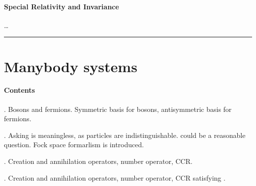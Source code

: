 \documentclass[letterpaper,10pt,english]{jupyterBook}
\begin{document}
\subsubsection*{Special Relativity and Invariance}

\sphinxAtStartPar
{}…


\bigskip\hrule\bigskip


\sphinxstepscope


\chapter{Many\sphinxhyphen{}body systems}
\label{\detokenize{ch/quantum-mechanics/many-body/many-body-quantum-mechanics:many-body-systems}}\label{\detokenize{ch/quantum-mechanics/many-body/many-body-quantum-mechanics:quantum-mechanics-many-body-quantum-mechanics}}\label{\detokenize{ch/quantum-mechanics/many-body/many-body-quantum-mechanics::doc}}\subsubsection*{Contents}

\sphinxAtStartPar
{\hyperref[\detokenize{ch/quantum-mechanics/many-body/identical-systems:quantum-mechanics-second-quantizazion-identical}]{}}. Bosons and fermions. Symmetric basis for bosons, anti\sphinxhyphen{}symmetric basis for fermions.

\sphinxAtStartPar
{\hyperref[\detokenize{ch/quantum-mechanics/many-body/fock-space:quantum-mechanics-second-quantizazion-second-quantization}]{}}. Asking  is meaningless, as particles are indistinguishable.  could be a reasonable question. Fock space formarlism is introduced.

\sphinxAtStartPar
{\hyperref[\detokenize{ch/quantum-mechanics/many-body/bosons:quantum-mechanics-second-quantizazion-bosons}]{}}. Creation and annihilation operators, number operator, CCR.

\sphinxAtStartPar
{\hyperref[\detokenize{ch/quantum-mechanics/many-body/fermions:quantum-mechanics-second-quantizazion-fermions}]{}}. Creation and annihilation operators, number operator, CCR satisfying .
\end{document}
